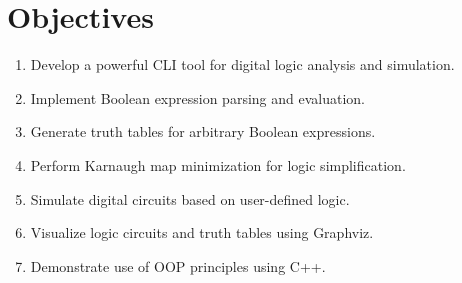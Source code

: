 \section{Objectives}
\renewcommand{\labelenumi}{\roman{enumi}.}
\begin{enumerate}
  \item Develop a powerful CLI tool for digital logic analysis and simulation.
  \item Implement Boolean expression parsing and evaluation.
  \item Generate truth tables for arbitrary Boolean expressions.
  \item Perform Karnaugh map minimization for logic simplification.
  \item Simulate digital circuits based on user-defined logic.
  \item Visualize logic circuits and truth tables using Graphviz.
  \item Demonstrate use of OOP principles using C++.
\end{enumerate}